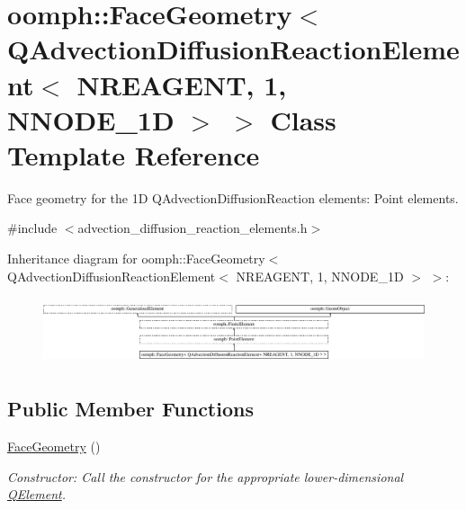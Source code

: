 \hypertarget{classoomph_1_1FaceGeometry_3_01QAdvectionDiffusionReactionElement_3_01NREAGENT_00_011_00_01NNODE__1D_01_4_01_4}{}\section{oomph\+:\+:Face\+Geometry$<$ Q\+Advection\+Diffusion\+Reaction\+Element$<$ N\+R\+E\+A\+G\+E\+NT, 1, N\+N\+O\+D\+E\+\_\+1D $>$ $>$ Class Template Reference}
\label{classoomph_1_1FaceGeometry_3_01QAdvectionDiffusionReactionElement_3_01NREAGENT_00_011_00_01NNODE__1D_01_4_01_4}


Face geometry for the 1D Q\+Advection\+Diffusion\+Reaction elements\+: Point elements.  




{\ttfamily \#include $<$advection\+\_\+diffusion\+\_\+reaction\+\_\+elements.\+h$>$}

Inheritance diagram for oomph\+:\+:Face\+Geometry$<$ Q\+Advection\+Diffusion\+Reaction\+Element$<$ N\+R\+E\+A\+G\+E\+NT, 1, N\+N\+O\+D\+E\+\_\+1D $>$ $>$\+:\begin{figure}[H]
\begin{center}
\leavevmode
\includegraphics[height=1.985816cm]{classoomph_1_1FaceGeometry_3_01QAdvectionDiffusionReactionElement_3_01NREAGENT_00_011_00_01NNODE__1D_01_4_01_4}
\end{center}
\end{figure}
\subsection*{Public Member Functions}
\begin{DoxyCompactItemize}
\item 
\hyperlink{classoomph_1_1FaceGeometry_3_01QAdvectionDiffusionReactionElement_3_01NREAGENT_00_011_00_01NNODE__1D_01_4_01_4_a376966a8608d69ee11733d99c748344c}{Face\+Geometry} ()
\begin{DoxyCompactList}\small\item\em Constructor\+: Call the constructor for the appropriate lower-\/dimensional \hyperlink{classoomph_1_1QElement}{Q\+Element}. \end{DoxyCompactList}\end{DoxyCompactItemize}
